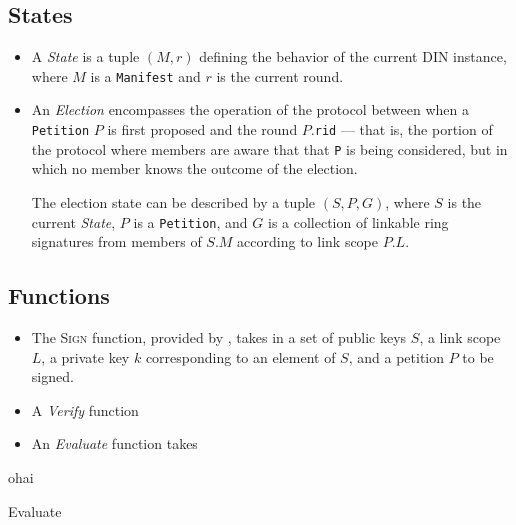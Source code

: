 \subsection{States}
\begin{itemize}
  \item A \emph{State} is a tuple $(M, r)$ defining the behavior of
    the current DIN instance, where $M$ is a \texttt{Manifest} and $r$ is the
    current round.

  \item An \emph{Election} encompasses the operation of the protocol between
    when a \texttt{Petition} $P$ is first proposed and the round
    $P$.\texttt{rid} --- that is, the portion of the protocol where members are
    aware that that \texttt{P} is being considered, but in which no member knows
    the outcome of the election.

    The election state can be described by a tuple
    $(S, P, G)$, where $S$ is the current \emph{State}, $P$ is a
    \texttt{Petition}, and $G$ is a collection of linkable ring signatures from
    members of $S.M$ according to link scope
    $P.L$.

\end{itemize}

\subsection{Functions}
\begin{itemize}
  \item The \textsc{Sign} function, provided by \cite{golrs}, takes in a set of
    public keys $S$, a link scope $L$, a
    private key $k$ corresponding to an element of $S$, and a petition $P$ to be
    signed.
  \item A \emph{Verify} function
  \item An \emph{Evaluate} function takes
\end{itemize}
\begin{algorithm}
  ohai
  \caption{Evaluate}
\end{algorithm}


